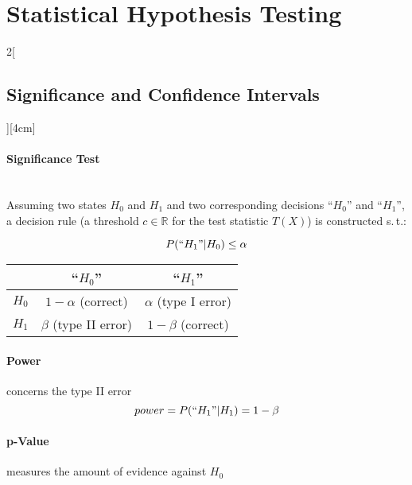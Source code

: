 \documentclass[8pt]{extarticle}
\begin{document}
  



\section{Statistical Hypothesis Testing}

\begin{multicols}{2}[\subsection{Significance and Confidence Intervals}][4cm]

\paragraph{Significance Test}  \ \\
\noindent Assuming two states $H_0$ and $H_1$ and two corresponding decisions ``$H_0$'' and ``$H_1$'', a decision rule (a threshold $c \in \mathbb{R}$ for the test statistic $T(X)$) is constructed s.\,t.:

$$P(``H_1"|H_0) \leq \alpha$$

\begin{center}
\begin{tabular}{c |c c}
& ``$H_0$'' & ``$H_1$'' \\
\hline
$H_0$ & $1-\alpha$ (correct) & $\alpha$ (type I error)\\
$H_1$ & $\beta$ (type II error) & $1-\beta$ (correct) \\
\end{tabular}
\end{center}

\paragraph{Power} concerns the type II error \ \\

$$power = P(``H_1"|H_1) = 1-\beta$$

\paragraph{p-Value} measures the amount of evidence against $H_0$


\end{multicols}
\end{document}

